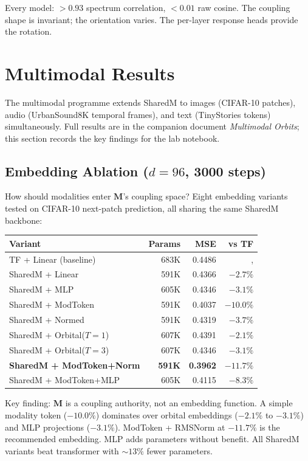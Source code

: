 \documentclass[11pt, a4paper]{article}
\newcommand{\M}{\mathbf{M}}
\theoremstyle{remark}
\begin{document}
Every model: $> 0.93$ spectrum correlation, $< 0.01$ raw cosine.
The coupling shape is invariant; the orientation varies.
The per-layer response heads provide the rotation.

\section{Multimodal Results}\label{sec:multimodal-results}

The multimodal programme extends SharedM to images (CIFAR-10 patches), audio (UrbanSound8K temporal frames), and text (TinyStories tokens) simultaneously.
Full results are in the companion document \textit{Multimodal Orbits}; this section records the key findings for the lab notebook.

\subsection{Embedding Ablation ($d{=}96$, 3000 steps)}

How should modalities enter $\M$'s coupling space?
Eight embedding variants tested on CIFAR-10 next-patch prediction, all sharing the same SharedM backbone:

\begin{center}\small
\begin{tabular}{@{}lrrr@{}}
\toprule
\textbf{Variant} & \textbf{Params} & \textbf{MSE} & \textbf{vs TF} \\
\midrule
TF + Linear (baseline) & 683K & 0.4486 & ,  \\
SharedM + Linear & 591K & 0.4366 & $-2.7\%$ \\
SharedM + MLP & 605K & 0.4346 & $-3.1\%$ \\
SharedM + ModToken & 591K & 0.4037 & $-10.0\%$ \\
SharedM + Normed & 591K & 0.4319 & $-3.7\%$ \\
SharedM + Orbital($T{=}1$) & 607K & 0.4391 & $-2.1\%$ \\
SharedM + Orbital($T{=}3$) & 607K & 0.4346 & $-3.1\%$ \\
\textbf{SharedM + ModToken+Norm} & \textbf{591K} & \textbf{0.3962} & $\mathbf{-11.7\%}$ \\
SharedM + ModToken+MLP & 605K & 0.4115 & $-8.3\%$ \\
\bottomrule
\end{tabular}
\end{center}

Key finding: $\M$ is a coupling authority, not an embedding function.
A simple modality token ($-10.0\%$) dominates over orbital embeddings ($-2.1\%$ to $-3.1\%$) and MLP projections ($-3.1\%$).
ModToken + RMSNorm at $-11.7\%$ is the recommended embedding.
MLP adds parameters without benefit.
All SharedM variants beat transformer with ${\sim}13\%$ fewer parameters.
\end{document}
